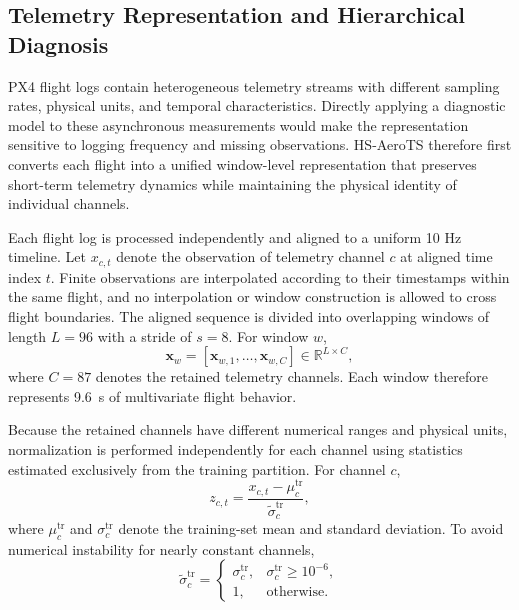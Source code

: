 \subsection{Telemetry Representation and Hierarchical Diagnosis}
\label{sec:data_preprocessing}
\label{sec:hierarchical_diagnosis}

PX4 flight logs contain heterogeneous telemetry streams with different sampling rates, physical units, and temporal characteristics. Directly applying a diagnostic model to these asynchronous measurements would make the representation sensitive to logging frequency and missing observations. HS-AeroTS therefore first converts each flight into a unified window-level representation that preserves short-term telemetry dynamics while maintaining the physical identity of individual channels.

Each flight log is processed independently and aligned to a uniform 10 Hz timeline. Let $x_{c,t}$ denote the observation of telemetry channel $c$ at aligned time index $t$. Finite observations are interpolated according to their timestamps within the same flight, and no interpolation or window construction is allowed to cross flight boundaries. The aligned sequence is divided into overlapping windows of length $L=96$ with a stride of $s=8$. For window $w$,
\begin{equation}
\mathbf{x}_{w}
=
[\mathbf{x}_{w,1},\ldots,\mathbf{x}_{w,C}]
\in
\mathbb{R}^{L\times C},
\label{eq:telemetry_window_representation}
\end{equation}
where $C=87$ denotes the retained telemetry channels. Each window therefore represents 9.6~s of multivariate flight behavior.

Because the retained channels have different numerical ranges and physical units, normalization is performed independently for each channel using statistics estimated exclusively from the training partition. For channel $c$,
\begin{equation}
z_{c,t}
=
\frac{x_{c,t}-\mu^{\mathrm{tr}}_{c}}
{\widetilde{\sigma}^{\mathrm{tr}}_{c}},
\label{eq:channel_standardization}
\end{equation}
where $\mu^{\mathrm{tr}}_{c}$ and $\sigma^{\mathrm{tr}}_{c}$ denote the training-set mean and standard deviation. To avoid numerical instability for nearly constant channels,
\begin{equation}
\widetilde{\sigma}^{\mathrm{tr}}_{c}
=
\begin{cases}
\sigma^{\mathrm{tr}}_{c}, & \sigma^{\mathrm{tr}}_{c}\geq10^{-6},\\
1, & \text{otherwise}.
\end{cases}
\label{eq:standard_deviation_floor}
\end{equation}

